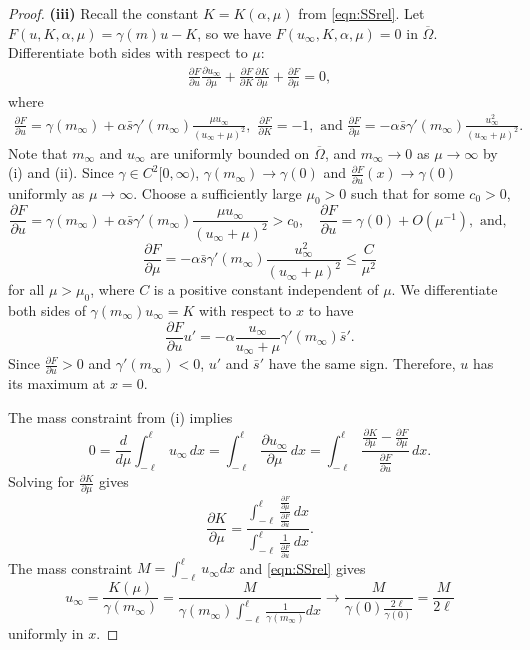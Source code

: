 \documentclass{article}
\begin{document}
\begin{proof}
\textbf{(iii)} Recall the constant $K=K(\alpha,\mu)$ from \eqref{eqn:SSrel}. Let $F(u,K,\alpha,\mu) = \gamma(m)u - K$, so we have $F(u_\infty,K,\alpha,\mu)=0$ in $\overline{\Omega}$. Differentiate both sides with respect to $\mu$:
\begin{align}\label{eqn: total deriv}
    \frac{\partial F}{\partial u}  \frac{\partial u_\infty}{\partial \mu} +\frac{\partial F}{\partial K} \frac{\partial K}{\partial \mu}  +\frac{\partial F}{\partial \mu}  =0,
\end{align} where
\begin{align*}
    \frac{\partial F}{\partial u}  = \gamma(m_\infty) +\alpha \bar s\gamma'(m_\infty) \frac{\mu u_\infty}{(u_\infty+\mu)^2}, \,\,\frac{\partial F}{\partial K}  = -1, \text{ and } \frac{\partial F}{\partial \mu}  = -\alpha\bar s\gamma'(m_\infty) \frac{u_\infty^2}{(u_\infty+\mu)^2}.
\end{align*}
Note that $m_\infty$ and $u_\infty$ are uniformly bounded on $\overline{\Omega}$, and $m_\infty \to 0$ as $\mu\to\infty$ by (i) and (ii). Since $\gamma\in C^2[0,\infty)$, $\gamma(m_\infty)\to\gamma(0)$ and $\frac{\partial F}{\partial u} (x)\to \gamma(0)$ uniformly as $\mu\to\infty$.  Choose a sufficiently large $\mu_0>0$ such that for some $c_0>0$,
\[\frac{\partial F}{\partial u}  = \gamma(m_\infty) +\alpha \bar s\gamma'(m_\infty) \frac{\mu u_\infty}{(u_\infty+\mu)^2}>c_0,\quad \frac{\partial F}{\partial u} =\gamma(0)+O(\mu^{-1}), \text{ and, }\]\[\frac{\partial F}{\partial \mu}  = -\alpha\bar s\gamma'(m_\infty)\frac{u_\infty^2}{(u_\infty+\mu)^2}\le \frac{C}{\mu^2} \] for all  $ \mu>\mu_0$, where $C$ is a positive constant independent of $\mu$. We  differentiate both sides of $\gamma(m_\infty)u_\infty=K$ with respect to $x$ to have
\[ \frac{\partial F}{\partial u}u' = -\alpha\frac{u_\infty}{u_\infty+\mu}\gamma'(m_\infty)\bar s'. \] Since $\frac{\partial F}{\partial u}>0$ and $ \gamma'(m_\infty)<0$, $u'$ and $\bar s'$ have the same sign. Therefore, $u$ has its maximum at $x=0$.

The mass constraint from (i) implies
\[
0 = \frac{d}{d\mu}\int_{-\ell}^{\ell} u_\infty\,dx
= \int_{-\ell}^{\ell} \frac{\partial u_\infty}{\partial \mu}\,dx
= \int_{-\ell}^{\ell} \frac{\frac{\partial K}{\partial \mu}  - \frac{\partial F}{\partial \mu} }{\frac{\partial F}{\partial u} }\,dx.
\]
Solving for $\frac{\partial K}{\partial \mu} $ gives
\[
\frac{\partial K}{\partial \mu} 
=
\frac{\displaystyle\int_{-\ell}^{\ell} \frac{\frac{\partial F}{\partial \mu} }{\frac{\partial F}{\partial u} }\,dx}
{\displaystyle\int_{-\ell}^{\ell} \frac{1}{\frac{\partial F}{\partial u} }\,dx}.
\]
The mass constraint $M=\int_{-\ell}^{\ell}u_\infty dx$ and \eqref{eqn:SSrel} gives
\[u_\infty = \frac{K(\mu)}{\gamma(m_\infty)} = \displaystyle\frac{M}{\gamma(m_\infty)\int_{-\ell}^{\ell}\frac{1}{\gamma(m_\infty)}dx}\to \frac{M}{\gamma(0)\frac{2\ell}{\gamma(0)}}=\frac{M}{2\ell}\] uniformly in $x$.


\end{proof}
\end{document}
